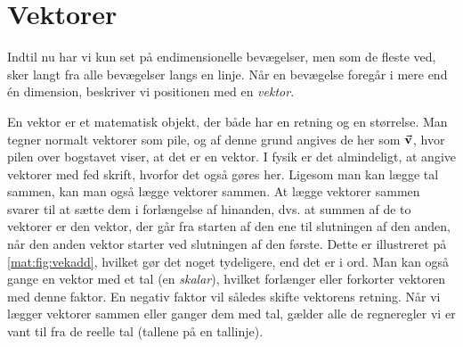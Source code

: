 \section{Vektorer} \label{mat:sec:vektorer}
Indtil nu har vi kun set på endimensionelle bevægelser, men som de fleste ved, sker langt fra alle bevægelser langs en linje. Når en bevægelse foregår i mere end én dimension, beskriver vi positionen med en \emph{vektor}.

En vektor er et matematisk objekt, der både har en retning og en størrelse.
Man tegner normalt vektorer som pile, og af denne grund angives de  her som $\va{v}$, hvor pilen over bogstavet viser, at det er en vektor. I fysik er det almindeligt, at angive vektorer med fed skrift, hvorfor det også gøres her.
Ligesom man kan lægge tal sammen, kan man også lægge vektorer sammen.
At lægge vektorer sammen svarer til at sætte dem i forlængelse af hinanden,
dvs. at summen af de to vektorer er den vektor, der går fra starten af den ene til slutningen af den anden, når den anden vektor starter ved slutningen af den første. Dette er illustreret på \cref{mat:fig:vekadd}, hvilket gør det noget tydeligere, end det er i ord.
Man kan også gange en vektor med et tal (en \emph{skalar}), hvilket forlænger eller forkorter vektoren med denne faktor. En negativ faktor vil således skifte vektorens retning.
Når vi lægger vektorer sammen eller ganger dem med tal, gælder alle de regneregler vi er vant til fra de reelle tal (tallene på en tallinje).

